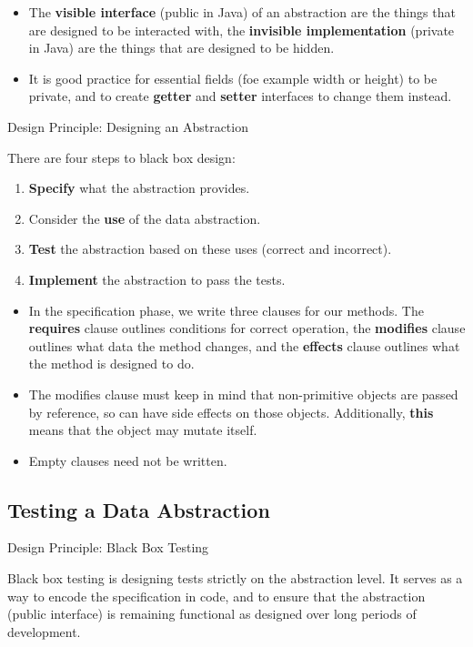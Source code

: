 \documentclass[letterpaper] {article}
\begin{document}
    \begin{itemize}
        \item The \textbf{visible interface} (public in Java) of an abstraction are the things that are designed to be interacted with, the \textbf{invisible implementation} (private in Java) are the things that are designed to be hidden. 
        \item It is good practice for essential fields (foe example width or height) to be private, and to create \textbf{getter} and \textbf{setter} interfaces to change them instead.
    \end{itemize}

    \begin{framed}
        \begin{center}
            Design Principle: Designing an Abstraction
        \end{center}
        There are four steps to black box design: 
        \begin{enumerate}
            \item \textbf{Specify} what the abstraction provides.
            \item Consider the \textbf{use} of the data abstraction.
            \item \textbf{Test} the abstraction based on these uses (correct and incorrect).
            \item \textbf{Implement} the abstraction to pass the tests. 
        \end{enumerate}
    \end{framed}
    \begin{itemize}
        \item In the specification phase, we write three clauses for our methods. The \textbf{requires} clause outlines conditions for correct operation, the \textbf{modifies} clause outlines what data the method changes, and the \textbf{effects} clause outlines what the method is designed to do. 
        \item The modifies clause must keep in mind that non-primitive objects are passed by reference, so can have side effects on those objects. Additionally, \textbf{this} means that the object may mutate itself. 
        \item Empty clauses need not be written. 
    \end{itemize}

    \subsection{Testing a Data Abstraction}
    \begin{framed}
        \begin{center}
            Design Principle: Black Box Testing
        \end{center}
        Black box testing is designing tests strictly on the abstraction level. It serves as a way to encode the specification in code, and to ensure that the abstraction (public interface) is remaining functional as designed over long periods of development. 
    \end{framed}
\end{document}
